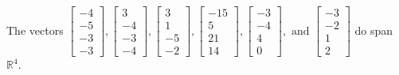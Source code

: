 \begin{exercise}
\begin{exerciseStatement}
  \end{exerciseStatement}
  \begin{exerciseAnswer}
   The vectors \(\left[\begin{array}{r}
-4 \\
-5 \\
-3 \\
-3
\end{array}\right] , \left[\begin{array}{r}
3 \\
-4 \\
-3 \\
-4
\end{array}\right] , \left[\begin{array}{r}
3 \\
1 \\
-5 \\
-2
\end{array}\right] , \left[\begin{array}{r}
-15 \\
5 \\
21 \\
14
\end{array}\right] , \left[\begin{array}{r}
-3 \\
-4 \\
4 \\
0
\end{array}\right] , \text{ and } \left[\begin{array}{r}
-3 \\
-2 \\
1 \\
2
\end{array}\right]\) 
  	 do  
	span \(\mathbb{R}^4\).
  


  \end{exerciseAnswer}
\end{exercise}
